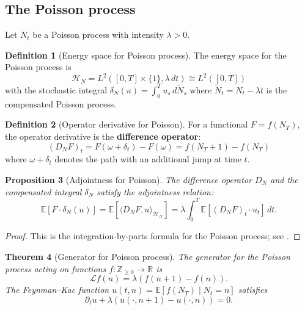 \documentclass[11pt]{article}
\newtheorem{theorem}{Theorem}[section]
\newtheorem{proposition}[theorem]{Proposition}
\theoremstyle{definition}
\newtheorem{definition}[theorem]{Definition}
\newcommand{\E}{\mathbb{E}}
\newcommand{\R}{\mathbb{R}}
\newcommand{\Hi}{\mathcal{H}}
\begin{document}
\subsection{The Poisson process}

Let $N_t$ be a Poisson process with intensity $\lambda > 0$.

\begin{definition}[Energy space for Poisson process]
The energy space for the Poisson process is
\begin{equation}
\Hi_N = L^2([0,T] \times \{1\}, \lambda \, dt) \cong L^2([0,T])
\end{equation}
with the stochastic integral $\delta_N(u) = \int_0^T u_s \, d\tilde{N}_s$ where $\tilde{N}_t = N_t - \lambda t$ is the compensated Poisson process.
\end{definition}

\begin{definition}[Operator derivative for Poisson]
For a functional $F = f(N_T)$, the operator derivative is the \textbf{difference operator}:
\begin{equation}
(D_N F)_t = F(\omega + \delta_t) - F(\omega) = f(N_T + 1) - f(N_T)
\end{equation}
where $\omega + \delta_t$ denotes the path with an additional jump at time $t$.
\end{definition}

\begin{proposition}[Adjointness for Poisson]\label{prop:poisson-adjoint}
The difference operator $D_N$ and the compensated integral $\delta_N$ satisfy the adjointness relation:
\begin{equation}
\E[F \cdot \delta_N(u)] = \E[\langle D_N F, u \rangle_{\Hi_N}] = \lambda \int_0^T \E[(D_N F)_t \cdot u_t] \, dt.
\end{equation}
\end{proposition}

\begin{proof}
This is the integration-by-parts formula for the Poisson process; see \cite{DiNunno2009}.
\end{proof}

\begin{theorem}[Generator for Poisson process]\label{thm:poisson-generator}
The generator for the Poisson process acting on functions $f : \mathbb{Z}_{\geq 0} \to \R$ is
\begin{equation}
\mathcal{L} f(n) = \lambda (f(n+1) - f(n)).
\end{equation}
The Feynman--Kac function $u(t,n) = \E[f(N_T) \mid N_t = n]$ satisfies
\begin{equation}
\partial_t u + \lambda(u(\cdot, n+1) - u(\cdot, n)) = 0.
\end{equation}
\end{theorem}
\end{document}
